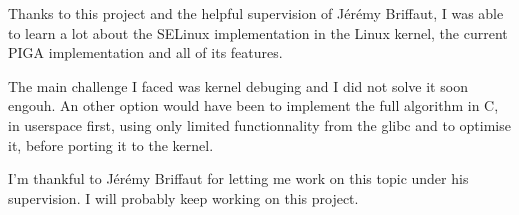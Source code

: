 \documentclass[pdftex,a4paper,titlepage,11pt]{article}
\begin{document}
Thanks to this project and the helpful supervision of Jérémy Briffaut, I was
able to learn a lot about the SELinux implementation in the Linux kernel, the
current PIGA implementation and all of its features.

\bigskip

The main challenge I faced was kernel debuging and I did not solve it soon
engouh. An other option would have been to implement the full algorithm in C, in
userspace first, using only limited functionnality from the glibc and to
optimise it, before porting it to the kernel.

\bigskip

I'm thankful to Jérémy Briffaut for letting me work on this topic under his
supervision. I will probably keep working on this project.


\newpage


{}


\nocite{*}
\end{document}
